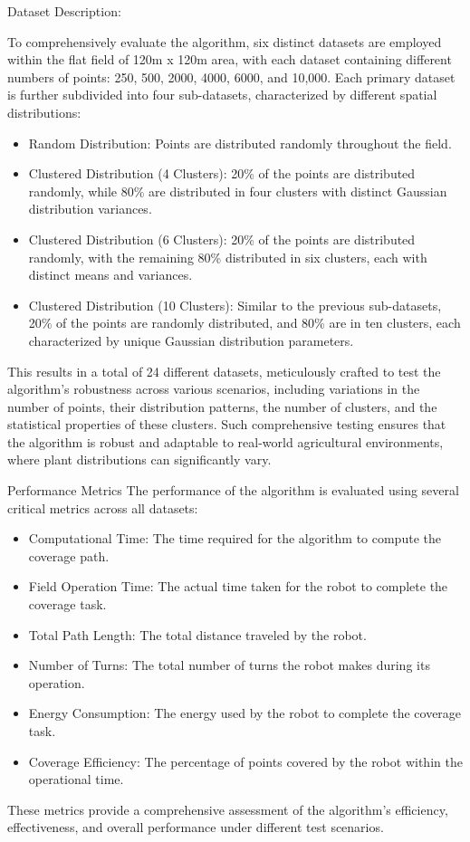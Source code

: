 \vspace*{6mm}  

Dataset Description:


To comprehensively evaluate the algorithm, six distinct datasets are employed within the flat field of 120m x 120m area, with each dataset containing different numbers of points: 250, 500, 2000, 4000, 6000, and 10,000. Each primary dataset is further subdivided into four sub-datasets, characterized by different spatial distributions:

\begin{itemize}
    \item Random Distribution: Points are distributed randomly throughout the field.
    \item Clustered Distribution (4 Clusters): 20\% of the points are distributed randomly, while 80\% are distributed in four clusters with distinct Gaussian distribution variances.
    \item Clustered Distribution (6 Clusters): 20\% of the points are distributed randomly, with the remaining 80\% distributed in six clusters, each with distinct means and variances.
    \item Clustered Distribution (10 Clusters): Similar to the previous sub-datasets, 20\% of the points are randomly distributed, and 80\% are in ten clusters, each characterized by unique Gaussian distribution parameters.
\end{itemize}

This results in a total of 24 different datasets, meticulously crafted to test the algorithm's robustness across various scenarios, including variations in the number of points, their distribution patterns, the number of clusters, and the statistical properties of these clusters. Such comprehensive testing ensures that the algorithm is robust and adaptable to real-world agricultural environments, where plant distributions can significantly vary.

\vspace*{6mm}  

Performance Metrics
The performance of the algorithm is evaluated using several critical metrics across all datasets:

\begin{itemize}
    \item Computational Time: The time required for the algorithm to compute the coverage path.
    \item Field Operation Time: The actual time taken for the robot to complete the coverage task.
    \item Total Path Length: The total distance traveled by the robot.
    \item Number of Turns: The total number of turns the robot makes during its operation.
    \item Energy Consumption: The energy used by the robot to complete the coverage task.
    \item Coverage Efficiency: The percentage of points covered by the robot within the operational time.
\end{itemize}
These metrics provide a comprehensive assessment of the algorithm's efficiency, effectiveness, and overall performance under different test scenarios.

